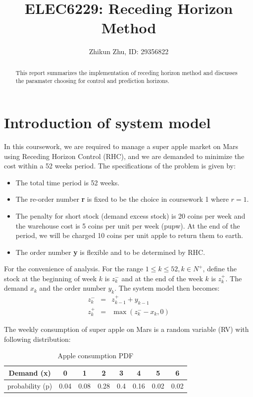 \documentclass[letterpaper, 10 pt, conference]{ieeeconf}
\title{\LARGE \bf
ELEC6229: Receding Horizon Method
}
\author{Zhikun Zhu, ID: 29356822%
}
\begin{document}
\maketitle
\thispagestyle{empty}
\pagestyle{empty}


\begin{abstract}
  This report summarizes the implementation of receding horizon method and discusses the paramater choosing for control and prediction horizons.
\end{abstract}




\section{Introduction of system model}
In this coursework, we are required to manage a super apple market on Mars using Receding Horizon Control (RHC), and we are demanded to minimize the cost within a 52 weeks period. The specifications of the problem is given by:
\begin{itemize}
  \item The total time period is 52 weeks.
  \item The re-order number \textbf{r} is fixed to be the choice in coursework 1 where $r=1$.
  \item The penalty for short stock (demand excess stock) is 20 coins per week and the warehouse cost is 5 coins per unit per week (pupw). At the end of the period, we will be charged 10 coins per unit apple to return them to earth.
  \item The order number \textbf{y} is flexible and to be determined by RHC.
\end{itemize}
For the convenience of analysis. For the range $1 \leq k \leq 52, k \in N^+$,  define the stock at the beginning of week $k$ is $z_k^-$ and at the end of the week $k$ is $z_k^+$. The demand $x_k$ and the order number $y_k$. The system model then becomes:
\begin{eqnarray}
      z_k^- &=& z_{k-1}^+ + y_{k-1}  \\
      z_k^+ &=& \max(z_k^- - x_k,0)
\end{eqnarray}

The weekly consumption of super apple on Mars is a random variable (RV) with following distribution:
\begin{table}[h]
  \caption{Apple consumption PDF}
  \label{consumptionPDF}
  \begin{center}
    \begin{tabular}{|c||c|c|c|c|c|c|c|}
      \hline
      Demand (x)   & 0 & 1 & 2 & 3 & 4 & 5 & 6\\
      \hline
      probability (p) & 0.04 & 0.08 & 0.28 & 0.4 & 0.16 & 0.02 & 0.02\\
      \hline
    \end{tabular}
  \end{center}
\end{table}
\end{document}

